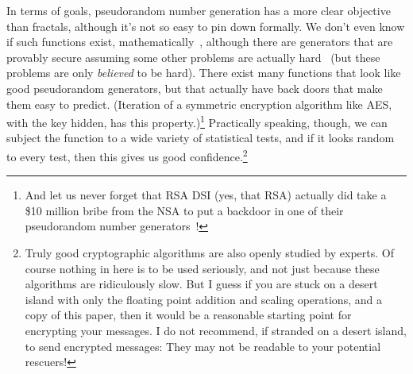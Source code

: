 \documentclass[twocolumn]{article}
\begin{document}

In terms of goals, pseudorandom number generation has a more clear
objective than fractals, although it's not so easy to pin down
formally. We don't even know if such functions exist,
mathematically~\cite{haastad1999pseudorandom}, although there are
generators that are provably secure assuming some other problems are
actually hard~\cite{blum1986simple} (but these problems are only {\em
  believed} to be hard). There exist many functions that look like
good pseudorandom generators, but that actually have back doors that
make them easy to predict. (Iteration of a symmetric encryption
algorithm like AES, with the key hidden, has this
property.)\footnote{And let us never forget that RSA DSI (yes, that
  RSA) actually did take a \$10 million bribe from the NSA to put a backdoor in one
  of their pseudorandom number generators~\cite{reuters2013secret}!}
Practically speaking, though, we can subject the function to a wide
variety of statistical tests, and if it looks random to every test,
then this gives us good confidence.\footnote{Truly good cryptographic
  algorithms are also openly studied by experts. Of course nothing in
  here is to be used seriously, and not just because these algorithms
  are ridiculously slow. But I guess if you are stuck on a desert
  island with only the floating point addition and scaling operations,
  and a copy of this paper, then it would be a reasonable starting
  point for encrypting your messages. I do not recommend, if stranded
  on a desert island, to send encrypted messages: They may not be
  readable to your potential rescuers!}
\end{document}
